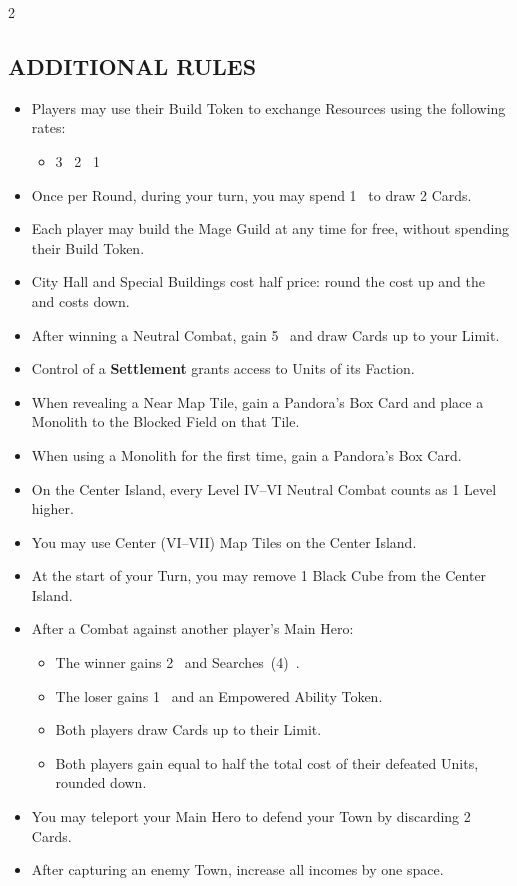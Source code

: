 \begin{multicols*}{2}
\subsection*{\MakeUppercase{Additional Rules}}
\begin{itemize}
  \item Players may use their Build Token to exchange Resources using the following rates:
  \begin{itemize}
    \item 3~  2~  1~
  \end{itemize}
  \item Once per Round, during your turn, you may spend 1~ to draw 2 Cards.
  \item Each player may build the Mage Guild at any time for free, without spending their Build Token.
  \item City Hall and Special Buildings cost half price: round the  cost up and the  and   costs down. %
  \item After winning a Neutral Combat, gain 5~ and draw Cards up to your  Limit.
  \item Control of a \textbf{Settlement} grants access to Units of its Faction.
  \item When revealing a Near Map Tile, gain a Pandora's Box Card and place a Monolith to the Blocked Field on that Tile.
  \item When using a Monolith for the first time, gain a Pandora's Box Card.
  \item On the Center Island, every Level IV--VI Neutral Combat counts as 1 Level higher.
  \item You may use Center (VI--VII) Map Tiles on the Center Island.
  \item At the start of your Turn, you may remove 1 Black Cube from the Center Island.
  \item After a Combat against another player's Main Hero:
  \begin{itemize}
    \item The winner gains 2~ and Searches~(4)~.
    \item The loser gains 1~ and an Empowered Ability Token.
    \item Both players draw Cards up to their  Limit.
    \item Both players gain  equal to half the total  cost of their defeated Units, rounded down.
  \end{itemize}
  \item You may teleport your Main Hero to defend your Town by discarding 2 Cards.
  \item After capturing an enemy Town, increase all incomes by one space.


\end{itemize}
\end{multicols*}
